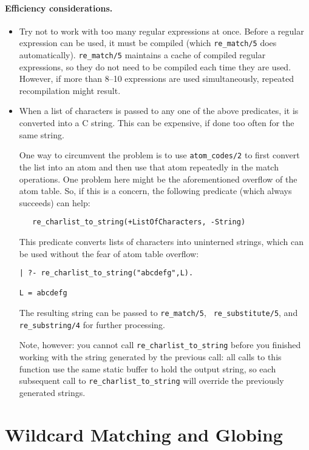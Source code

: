 \paragraph{Efficiency considerations.}
\begin{itemize}
  \item  Try not to work with too many regular expressions at once.
    Before a regular expression can be used, it must be compiled (which
    {\tt re\_match/5} does automatically).
    {\tt re\_match/5} maintains a cache of compiled regular expressions, so
    they do not need to be compiled each time they are used. However, if
    more than 8--10 expressions are used simultaneously, repeated
    recompilation might result.
  \item When a list of characters is passed to any one of the above
    predicates, it is converted into a C string. This can be expensive, if
    done too often for the same string.
    
    One way to circumvent the problem is to use {\tt atom\_codes/2} to
    first convert the list into an atom and then use that atom repeatedly
    in the match operations. One problem here might be the aforementioned
    overflow of the atom table. So, if this is a concern, the following
    predicate (which always succeeds) can help:
\begin{verbatim}
   re_charlist_to_string(+ListOfCharacters, -String)  
\end{verbatim}
    This predicate converts lists of characters into uninterned strings,
    which can be used without the fear of atom table overflow:
\begin{verbatim}
| ?- re_charlist_to_string("abcdefg",L).

L = abcdefg  
\end{verbatim}
    The resulting string can be passed to {\tt re\_match/5}, {\tt
    re\_substitute/5}, and {\tt re\_substring/4} for further processing.
  
  Note, however: you cannot call {\tt re\_charlist\_to\_string} before you
  finished working with the string generated by the previous call: all
  calls to this function use the same static buffer to hold the output
  string, so each subsequent call to {\tt re\_charlist\_to\_string} will
  override the previously generated strings.
\end{itemize}


\section{Wildcard Matching and Globing}

